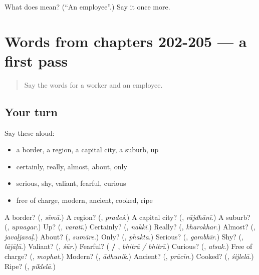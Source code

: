 \begin{tcolorbox}[breakable,colback=teal!4,colframe=teal!35!black,title={Before you move on}]
What does  mean? (\textquotedblleft{}An employee\textquotedblright{}.) Say it once more.
\end{tcolorbox}
\section[(dialogue)]{Words from chapters 202-205 — a first pass}

\label{lesson:MR-R210-first-pass-words-from-chapters-202-205}



\begin{quote}
Say the words for a worker and an employee.
\end{quote}

\subsection*{Your turn}
Say these aloud:

\begin{itemize}
\raggedright
  \item a border, a region, a capital city, a suburb, up
  \item certainly, really, almost, about, only
  \item serious, shy, valiant, fearful, curious
  \item free of charge, modern, ancient, cooked, ripe
\end{itemize}

\begin{tcolorbox}[breakable,colback=teal!4,colframe=teal!35!black,title={Before you move on}]
A border? (\textbf{}, \emph{sīmā}.) A region? (\textbf{}, \emph{pradeś}.) A capital city? (\textbf{}, \emph{rājdhānī}.) A suburb? (\textbf{}, \emph{upnagar}.) Up? (\textbf{}, \emph{varatī}.) Certainly? (\textbf{}, \emph{nakkī}.) Really? (\textbf{}, \emph{kharokhar}.) Almost? (\textbf{}, \emph{javaḷjavaḷ}.) About? (\textbf{}, \emph{sumāre}.) Only? (\textbf{}, \emph{phakta}.) Serious? (\textbf{}, \emph{gambhīr}.) Shy? (\textbf{}, \emph{lājāḷū}.) Valiant? (\textbf{}, \emph{śūr}.) Fearful? (\textbf{ / }, \emph{bhitrā / bhitrī}.) Curious? (\textbf{}, \emph{utsuk}.) Free of charge? (\textbf{}, \emph{mophat}.) Modern? (\textbf{}, \emph{ādhunik}.) Ancient? (\textbf{}, \emph{prācīn}.) Cooked? (\textbf{}, \emph{śijlelā}.) Ripe? (\textbf{}, \emph{piklelā}.)
\end{tcolorbox}
